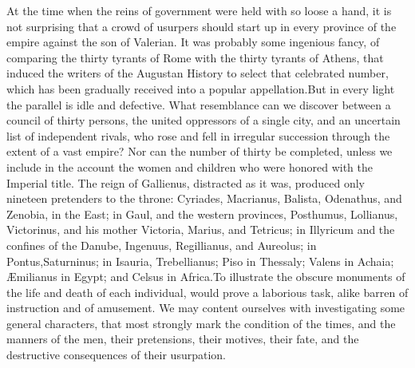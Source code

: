 At the time when the reins of government were held with so loose
a hand, it is not surprising that a crowd of usurpers should
start up in every province of the empire against the son of
Valerian. It was probably some ingenious fancy, of comparing the
thirty tyrants of Rome with the thirty tyrants of Athens, that
induced the writers of the Augustan History to select that
celebrated number, which has been gradually received into a
popular appellation.\footnotemark[157] But in every light the parallel is idle
and defective. What resemblance can we discover between a council
of thirty persons, the united oppressors of a single city, and an
uncertain list of independent rivals, who rose and fell in
irregular succession through the extent of a vast empire? Nor can
the number of thirty be completed, unless we include in the
account the women and children who were honored with the Imperial
title. The reign of Gallienus, distracted as it was, produced
only nineteen pretenders to the throne: Cyriades, Macrianus,
Balista, Odenathus, and Zenobia, in the East; in Gaul, and the
western provinces, Posthumus, Lollianus, Victorinus, and his
mother Victoria, Marius, and Tetricus; in Illyricum and the
confines of the Danube, Ingenuus, Regillianus, and Aureolus; in
Pontus,\footnotemark[158] Saturninus; in Isauria, Trebellianus; Piso in
Thessaly; Valens in Achaia; Æmilianus in Egypt; and Celsus in
Africa.\footnotemark[1581] To illustrate the obscure monuments of the life and
death of each individual, would prove a laborious task, alike
barren of instruction and of amusement. We may content ourselves
with investigating some general characters, that most strongly
mark the condition of the times, and the manners of the men,
their pretensions, their motives, their fate, and the destructive
consequences of their usurpation.\footnotemark[159]




